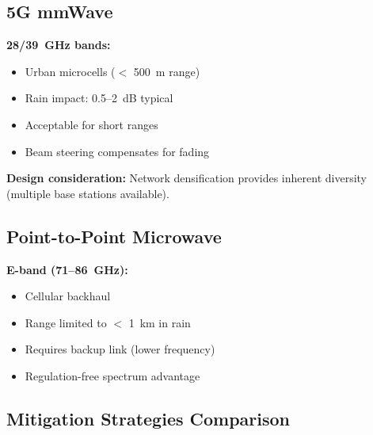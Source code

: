 \subsection{5G mmWave}

\textbf{28/39~GHz bands:}
\begin{itemize}
\item Urban microcells ($<$ 500~m range)
\item Rain impact: 0.5--2~dB typical
\item Acceptable for short ranges
\item Beam steering compensates for fading
\end{itemize}

\textbf{Design consideration:} Network densification provides inherent diversity (multiple base stations available).

\subsection{Point-to-Point Microwave}

\textbf{E-band (71--86~GHz):}
\begin{itemize}
\item Cellular backhaul
\item Range limited to $<$ 1~km in rain
\item Requires backup link (lower frequency)
\item Regulation-free spectrum advantage
\end{itemize}

\subsection{Mitigation Strategies Comparison}


